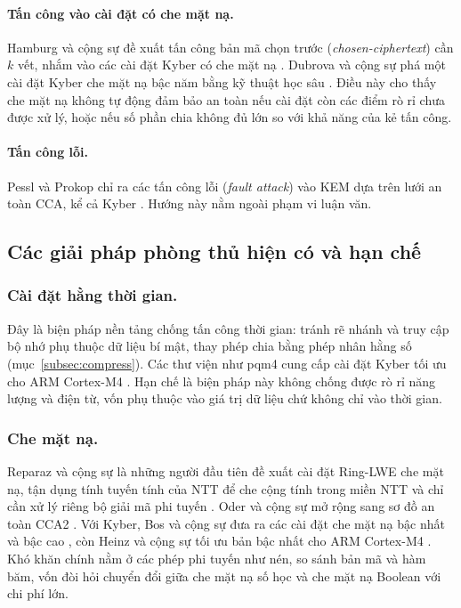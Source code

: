 \documentclass[../LuanVan.tex]{subfiles}
\begin{document}
\paragraph{Tấn công vào cài đặt có che mặt nạ.} Hamburg và cộng sự đề xuất tấn công bản mã chọn trước (\textit{chosen-ciphertext}) cần $k$ vết, nhắm vào các cài đặt Kyber có che mặt nạ \cite{Hamburg21}. Dubrova và cộng sự phá một cài đặt Kyber che mặt nạ bậc năm bằng kỹ thuật học sâu \cite{Dubrova23}. Điều này cho thấy che mặt nạ không tự động đảm bảo an toàn nếu cài đặt còn các điểm rò rỉ chưa được xử lý, hoặc nếu số phần chia không đủ lớn so với khả năng của kẻ tấn công.

\paragraph{Tấn công lỗi.} Pessl và Prokop chỉ ra các tấn công lỗi (\textit{fault attack}) vào KEM dựa trên lưới an toàn CCA, kể cả Kyber \cite{PesslProkop21}. Hướng này nằm ngoài phạm vi luận văn.

\subsection{Các giải pháp phòng thủ hiện có và hạn chế}\label{subsec:phongthu}

\subsubsection{Cài đặt hằng thời gian.} Đây là biện pháp nền tảng chống tấn công thời gian: tránh rẽ nhánh và truy cập bộ nhớ phụ thuộc dữ liệu bí mật, thay phép chia bằng phép nhân hằng số (mục~\ref{subsec:compress}). Các thư viện như pqm4 cung cấp cài đặt Kyber tối ưu cho ARM Cortex-M4 \cite{KannwischerRSS19}. Hạn chế là biện pháp này không chống được rò rỉ năng lượng và điện từ, vốn phụ thuộc vào giá trị dữ liệu chứ không chỉ vào thời gian.

\subsubsection{Che mặt nạ.} Reparaz và cộng sự là những người đầu tiên đề xuất cài đặt Ring-LWE che mặt nạ, tận dụng tính tuyến tính của NTT để che cộng tính trong miền NTT và chỉ cần xử lý riêng bộ giải mã phi tuyến \cite{ReparazRVV15}. Oder và cộng sự mở rộng sang sơ đồ an toàn CCA2 \cite{Oder18}. Với Kyber, Bos và cộng sự đưa ra các cài đặt che mặt nạ bậc nhất và bậc cao \cite{Bos21}, còn Heinz và cộng sự tối ưu bản bậc nhất cho ARM Cortex-M4 \cite{Heinz22}. Khó khăn chính nằm ở các phép phi tuyến như nén, so sánh bản mã và hàm băm, vốn đòi hỏi chuyển đổi giữa che mặt nạ số học và che mặt nạ Boolean với chi phí lớn.
\end{document}
